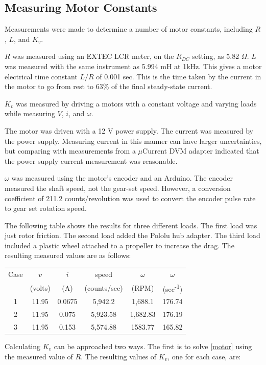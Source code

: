 \documentclass[12pt,letterpaper]{article}
\begin{document}
\begin{appendices}
\section{Measuring Motor Constants}
\label{appendix:measure}
Measurements were made to determine a number of motor constants, including $R$, $L$, and $K_{v}$.  

$R$ was measured using an EXTEC LCR meter, on the $R_{DC}$ setting, as 5.82 $\Omega$. $L$ was 
measured with the same instrument as 5.994 mH at 1kHz.  This gives a motor electrical time constant $L/R$ of 0.001 sec.  This is the time taken by the current in the motor to go from rest to 63\% of the final steady-state current.

$K_{v}$ was measured by driving a motors with a constant voltage and
varying loads while measuring $V$, $i$, and $\omega$.  


The motor was driven with a 12 V power supply.  The current was measured by the power supply.  Measuring current in this manner can have larger uncertainties, but comparing with measurements from a $\mu$Current DVM adapter indicated that the power supply current measurement was reasonable.  


$\omega$ was measured using the motor's encoder and an Arduino.  The encoder measured the shaft speed, not the gear-set speed.  However, a conversion coefficient of 211.2 counts/revolution was used to convert the encoder pulse rate to gear set rotation speed.

The following table shows the results for three different loads.  The first load was just rotor friction.  The second load added the Pololu hub adapter.  The third load included a plastic wheel attached to a propeller to increase the drag.
The resulting measured values are as follows: \\

\begin{tabular}{|c|c|c|c|c|c|}
\hline
Case & $v$ & $i$ & speed & $\omega$ & $\omega$ \\
      & (volts) &  (A) & (counts/sec) & (RPM) & (sec\textsuperscript{-1}) \\
\hline
1    & 11.95 & 0.0675 & 5,942.2   & 1,688.1   & 176.74 \\
2    & 11.95 & 0.075   & 5,923.58 & 1,682.83 & 176.19 \\ 
3    & 11.95 & 0.153   & 5,574.88 & 1583.77  & 165.82 \\
\hline
\end{tabular}

Calculating $K_{v}$ can be approached two ways.  The first is to solve \eqref{motor} using the measured
value of $R$.  The resulting values of $K_{v}$, one for each case, are:


\end{appendices}
\end{document}
